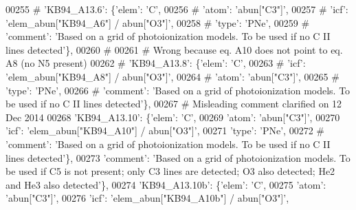 \begin{DoxyCode}
00255 \textcolor{comment}{#                         'KB94\_A13.6': \{'elem': 'C',}
00256 \textcolor{comment}{#                                      'atom': 'abun["C3"]',}
00257 \textcolor{comment}{#                                      'icf': 'elem\_abun["KB94\_A6"] / abun["O3"]',}
00258 \textcolor{comment}{#                                      'type': 'PNe',}
00259 \textcolor{comment}{#                                      'comment': 'Based on a grid of photoionization models. To be used if
       no C II lines detected'\},}
00260 \textcolor{comment}{#}
00261 \textcolor{comment}{# Wrong because eq. A10 does not point to eq. A8 (no N5 present)}
00262 \textcolor{comment}{#                         'KB94\_A13.8': \{'elem': 'C',}
00263 \textcolor{comment}{#                                      'icf': 'elem\_abun["KB94\_A8"] / abun["O3"]',}
00264 \textcolor{comment}{#                                      'atom': 'abun["C3"]',}
00265 \textcolor{comment}{#                                      'type': 'PNe',}
00266 \textcolor{comment}{#                                      'comment': 'Based on a grid of photoionization models. To be used if
       no C II lines detected'\},}
00267 \textcolor{comment}{# Misleading comment clarified on 12 Dec 2014 }
00268                          \textcolor{stringliteral}{'KB94\_A13.10'}: \{\textcolor{stringliteral}{'elem'}: \textcolor{stringliteral}{'C'},
00269                                       \textcolor{stringliteral}{'atom'}: \textcolor{stringliteral}{'abun["C3"]'},
00270                                       \textcolor{stringliteral}{'icf'}: \textcolor{stringliteral}{'elem\_abun["KB94\_A10"] / abun["O3"]'},
00271                                       \textcolor{stringliteral}{'type'}: \textcolor{stringliteral}{'PNe'},
00272 \textcolor{comment}{#                                     'comment': 'Based on a grid of photoionization models. To be used if
       no C II lines detected'\},}
00273                                       \textcolor{stringliteral}{'comment'}: \textcolor{stringliteral}{'Based on a grid of photoionization models. To be used if
       C5 is not present; only C3 lines are detected; O3 also detected; He2 and He3 also detected'}\},
00274                          \textcolor{stringliteral}{'KB94\_A13.10b'}: \{\textcolor{stringliteral}{'elem'}: \textcolor{stringliteral}{'C'},
00275                                       \textcolor{stringliteral}{'atom'}: \textcolor{stringliteral}{'abun["C3"]'},
00276                                       \textcolor{stringliteral}{'icf'}: \textcolor{stringliteral}{'elem\_abun["KB94\_A10b"] / abun["O3"]'},

\end{DoxyCode}
